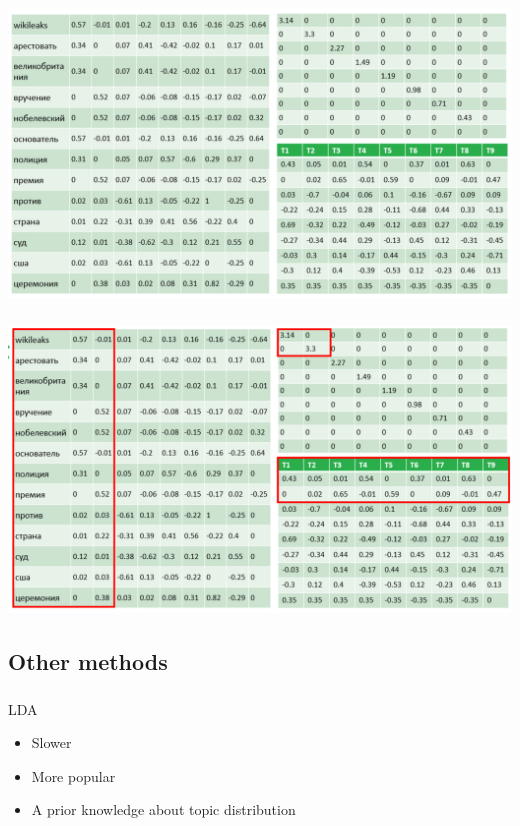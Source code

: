 \documentclass[t, 11pt]{beamer}
\begin{document}
\begin{frame}
\frametitle{\insertsection}
\frametitle{\insertsubsection}


\includegraphics[width=0.9\linewidth]{decopm.png}
\end{frame}

%
\begin{frame}
	\frametitle{\insertsection}
	\frametitle{\insertsubsection}
	
	
	\includegraphics[width=0.9\linewidth]{deux.png}
\end{frame}

\subsection{Other methods}

\begin{frame}
	\frametitle{\insertsection}
	\frametitle{\insertsubsection}  
	LDA 
	
	\vspace{0.5cm}
	
	\begin{itemize}
		\item Slower
		\item More popular
		\item A prior knowledge about topic distribution
	\end{itemize}	
	\vspace{0.5cm}
	
\end{frame}
\end{document}
